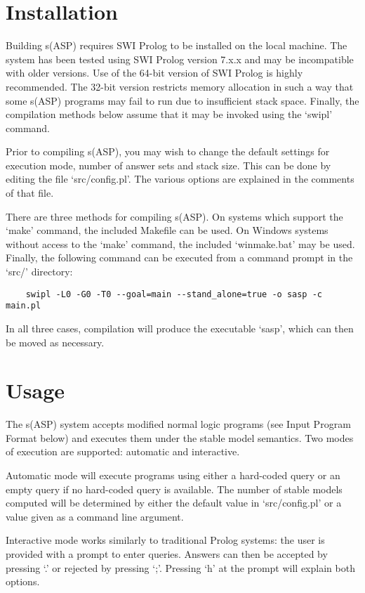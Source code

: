 \documentclass[]{article}
\begin{document}
\section{Installation}

Building s(ASP) requires SWI Prolog to be installed on the local machine. The
system has been tested using SWI Prolog version 7.x.x and may be incompatible
with older versions. Use of the 64-bit version of SWI Prolog is highly
recommended. The 32-bit version restricts memory allocation in such a way that
some s(ASP) programs may fail to run due to insufficient stack space. Finally,
the compilation methods below assume that it may be invoked using the `swipl'
command.

Prior to compiling s(ASP), you may wish to change the default settings for
execution mode, number of answer sets and stack size. This can be done by
editing the file `src/config.pl'. The various options are explained in the
comments of that file.

There are three methods for compiling s(ASP). On systems which support the
`make' command, the included Makefile can be used. On Windows systems without
access to the `make' command, the included `winmake.bat' may be used. Finally,
the following command can be executed from a command prompt in the `src/'
directory:
\begin{verbatim}
    swipl -L0 -G0 -T0 --goal=main --stand_alone=true -o sasp -c main.pl
\end{verbatim}
In all three cases, compilation will produce the executable `sasp',
which can then be moved as necessary.


\section{Usage}

The s(ASP) system accepts modified normal logic programs (see Input Program
Format below) and executes them under the stable model semantics. Two modes of
execution are supported: automatic and interactive.

Automatic mode will execute programs using either a hard-coded query or an empty
query if no hard-coded query is available. The number of stable models computed
will be determined by either the default value in `src/config.pl' or a value
given as a command line argument.

Interactive mode works similarly to traditional Prolog systems: the user is
provided with a prompt to enter queries. Answers can then be accepted by
pressing `.' or rejected by pressing `;'. Pressing `h' at the prompt will
explain both options.
\end{document}
